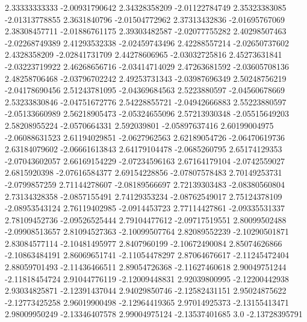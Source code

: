  2.33333333333   -2.00931790642
  2.34328358209   -2.01122784749
  2.35323383085   -2.01313778855
   2.3631840796   -2.01504772962
  2.37313432836   -2.01695767069
  2.38308457711   -2.01886761175
  2.39303482587   -2.02077755282
  2.40298507463   -2.02268749389
  2.41293532338   -2.02459743496
  2.42288557214   -2.02650737602
   2.4328358209   -2.02841731709
  2.44278606965   -2.03032725816
  2.45273631841   -2.03223719922
  2.46268656716   -2.03414714029
  2.47263681592   -2.03605708136
  2.48258706468   -2.03796702242
  2.49253731343   -2.03987696349
  2.50248756219   -2.04178690456
  2.51243781095   -2.04369684563
   2.5223880597   -2.04560678669
  2.53233830846   -2.04751672776
  2.54228855721   -2.04942666883
  2.55223880597   -2.05133660989
  2.56218905473   -2.05324655096
  2.57213930348   -2.05515649203
  2.58208955224    -2.0570664331
    2.592039801   -2.05897637416
  2.60199004975   -2.06088631523
  2.61194029851    -2.0627962563
  2.62189054726   -2.06470619736
  2.63184079602   -2.06661613843
  2.64179104478    -2.0685260795
  2.65174129353   -2.07043602057
  2.66169154229   -2.07234596163
  2.67164179104    -2.0742559027
   2.6815920398   -2.07616584377
  2.69154228856   -2.07807578483
  2.70149253731    -2.0799857259
  2.71144278607   -2.08189566697
  2.72139303483   -2.08380560804
  2.73134328358    -2.0857155491
  2.74129353234   -2.08762549017
  2.75124378109   -2.08953543124
  2.76119402985    -2.0914453723
  2.77114427861   -2.09335531337
  2.78109452736   -2.09526525444
  2.79104477612   -2.09717519551
  2.80099502488   -2.09908513657
  2.81094527363   -2.10099507764
  2.82089552239   -2.10290501871
  2.83084577114   -2.10481495977
   2.8407960199   -2.10672490084
  2.85074626866   -2.10863484191
  2.86069651741   -2.11054478297
  2.87064676617   -2.11245472404
  2.88059701493   -2.11436466511
  2.89054726368   -2.11627460618
  2.90049751244   -2.11818454724
  2.91044776119   -2.12009448831
  2.92039800995   -2.12200442938
  2.93034825871   -2.12391437044
  2.94029850746   -2.12582431151
  2.95024875622   -2.12773425258
  2.96019900498   -2.12964419365
  2.97014925373   -2.13155413471
  2.98009950249   -2.13346407578
  2.99004975124   -2.13537401685
            3.0   -2.13728395791
